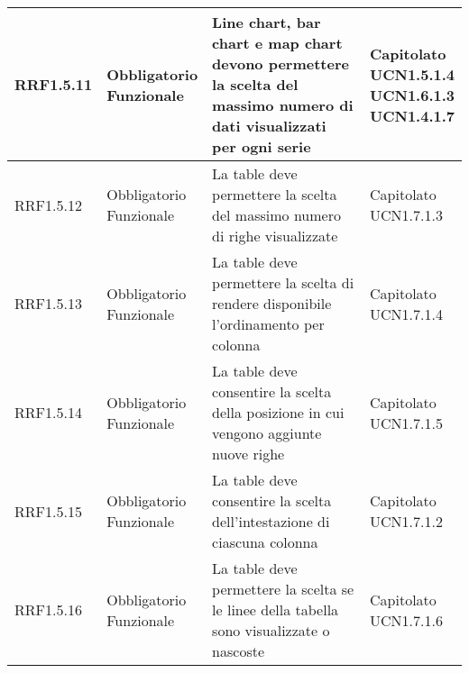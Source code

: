 \begin{longtabu}[c]{|X[0.7,l]|X[l]|X[2.5,l]|X[l]|}
                RRF1.5.11 & 
                \parbox[t]{4cm}{ Obbligatorio \\ Funzionale} & Line chart, bar chart e map chart devono permettere la scelta del massimo numero di dati visualizzati per ogni serie & \parbox[t]{4cm}{Capitolato \\ UCN1.5.1.4 \\ UCN1.6.1.3 \\ UCN1.4.1.7 }  \\ 
                \hline
                
                RRF1.5.12 & 
                \parbox[t]{4cm}{ Obbligatorio \\ Funzionale} & La table deve permettere la scelta del massimo numero di righe visualizzate & \parbox[t]{4cm}{Capitolato \\ UCN1.7.1.3 }  \\ 
                \hline
                
                RRF1.5.13 & 
                \parbox[t]{4cm}{ Obbligatorio \\ Funzionale} & La table deve permettere la scelta di rendere disponibile l'ordinamento per colonna & \parbox[t]{4cm}{Capitolato \\ UCN1.7.1.4 }  \\ 
                \hline
                
                RRF1.5.14 & 
                \parbox[t]{4cm}{ Obbligatorio \\ Funzionale} & La table deve consentire la scelta della posizione in cui vengono aggiunte nuove righe & \parbox[t]{4cm}{Capitolato \\ UCN1.7.1.5 }  \\ 
                \hline
                
                RRF1.5.15 & 
                \parbox[t]{4cm}{ Obbligatorio \\ Funzionale} & La table deve consentire la scelta dell'intestazione di ciascuna colonna & \parbox[t]{4cm}{Capitolato \\ UCN1.7.1.2 }  \\ 
                \hline
                
                RRF1.5.16 & 
                \parbox[t]{4cm}{ Obbligatorio \\ Funzionale} & La table deve permettere la scelta se le linee della tabella sono visualizzate o nascoste & \parbox[t]{4cm}{Capitolato \\ UCN1.7.1.6 }  \\ 
                \hline
                

\end{longtabu}
